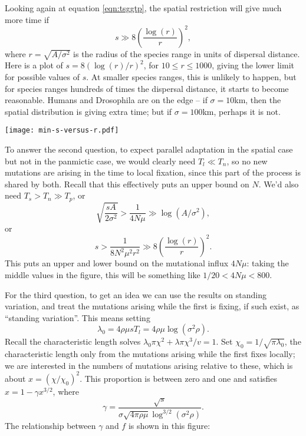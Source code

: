 \documentclass{article}
\begin{document}
Looking again at equation \eqref{eqn:tsggtp},
the spatial restriction will give much more time if
\[
  s \gg 8 \left( \frac{\log(r)}{r} \right)^2,
\]
where $r=\sqrt{A/\sigma^2}$ is the radius of the species range in units of dispersal distance.
Here is a plot of $s = 8 \left( \log(r)/r \right)^2$,
for $10 \le r \le 1000$, giving the lower limit for possible values of $s$.
At smaller species ranges, this is unlikely to happen, 
but for species ranges hundreds of times the dispersal distance, it starts to become reasonable.
Humans and Drosophila are on the edge -- if $\sigma=10$km,
then the spatial distribution is giving extra time; 
but if $\sigma=100$km, perhaps it is not.

  \texttt{[image: min-s-versus-r.pdf]}

To answer the second question, 
to expect parallel adaptation in the spatial case but not in the panmictic case,
we would clearly need $T_l \ll T_n$, so no new mutations are arising in the time to local fixation,
since this part of the process is shared by both.
Recall that this effectively puts an upper bound on $N$.
We'd also need
$T_s > T_n \gg T_p$,
or
\begin{equation}
  \sqrt{\frac{sA}{2\sigma^2}} > \frac{1}{4N\mu} \gg \log(A/\sigma^2) ,
\end{equation}
or
\begin{equation}
  s > \frac{1}{8 N^2 \mu^2 r^2} \gg 8 \left(\frac{ \log(r) }{ r }\right)^2 .
\end{equation}
This puts an upper and lower bound on the mutational influx $4N\mu$:
taking the middle values in the figure, 
this will be something like $1/20 < 4N\mu < 800$.

For the third question,
to get an idea we can use the results on standing variation,
and treat the mutations arising while the first is fixing, if such exist, as ``standing variation''.
This means setting 
\[
  \lambda_0 = 4 \rho \mu s T_l = 4 \rho \mu \log(\sigma^2 \rho) .
\]
Recall the characteristic length solves $\lambda_0 \pi \chi^2 + \lambda \pi \chi^3/v = 1$.
Set $\chi_0 = 1/\sqrt{\pi \lambda_0}$, 
the characteristic length only from the mutations arising while the first fixes locally;
we are interested in the numbers of mutations arising relative to these,
which is about $x=(\chi/\chi_0)^2$.
This proportion is between zero and one and satisfies
$x = 1-\gamma x^{3/2}$, 
where 
\[
  \gamma = \frac{ \sqrt{s} }{ \sigma \sqrt{4 \pi \rho \mu} \log^{3/2}(\sigma^2 \rho) } .
\]
The relationship between $\gamma$ and $f$ is shown in this figure:
\end{document}
